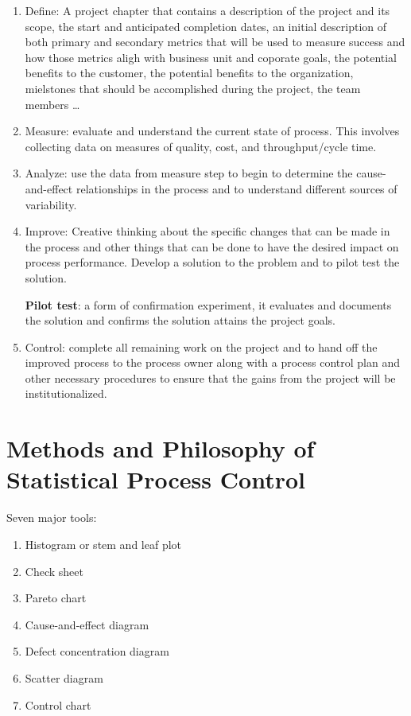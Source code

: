 \documentclass[12pt,oneside,a4paper]{article}
\numberwithin{equation}{section}
\begin{document}
\begin{enumerate}
\item Define: A project chapter that contains a description of the project and its scope, the start and anticipated completion dates, an initial description of both primary and secondary metrics that will be used to measure success and how those metrics aligh with business unit and coporate goals, the potential benefits to the customer, the potential benefits to the organization, mielstones that should be accomplished during the project, the team members \ldots 

\item Measure: evaluate and understand the current state of process.  This involves collecting data on measures of quality, cost, and throughput/cycle time. 

\item Analyze: use the data from measure step to begin to determine the cause-and-effect relationships in the process and to understand different sources of variability. 

\item Improve: Creative thinking about the specific changes that can be made in the process and other things that can be done to have the desired impact on process performance. Develop a solution to the problem and to pilot test the solution.  

\textbf{Pilot test}: a form of confirmation experiment, it evaluates and documents the solution and confirms the solution attains the project goals. 

\item Control: complete all remaining work on the project and to hand off the improved process to the process owner along with a process control plan and other necessary procedures to ensure that the gains from the project will be institutionalized. 

\end{enumerate}

\section{Methods and Philosophy of Statistical Process Control}

Seven major tools: 
\begin{enumerate}
    \item Histogram or stem and leaf plot 
	\item Check sheet 
	\item Pareto chart 
	\item Cause-and-effect diagram  
	\item Defect concentration diagram 
	\item Scatter diagram 
	\item Control chart 	
\end{enumerate}
\end{document}
